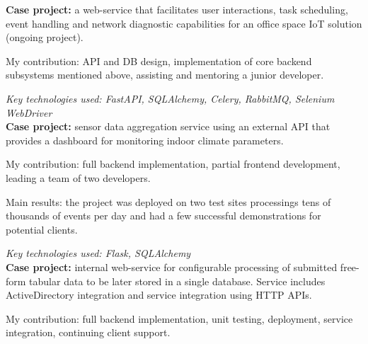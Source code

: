 \documentclass[
	a4paper,
]{fortysecondscv}
\begin{document}
\makefrontsidebar

\begin{cvtable}[3]
\end{cvtable}


\textbf{Case project:} a web-service that facilitates user interactions, task scheduling, event handling and network diagnostic capabilities for an office space IoT solution (ongoing project).

My contribution: API and DB design, implementation of core backend subsystems mentioned above, assisting and mentoring a junior developer.

\textit{Key technologies used: FastAPI, SQLAlchemy, Celery, RabbitMQ, Selenium WebDriver}
\\[0.5em]
\textbf{Case project:} sensor data aggregation service using an external API that provides a dashboard for monitoring indoor climate parameters.

My contribution: full backend implementation, partial frontend development, leading a team of two developers.

Main results: the project was deployed on two test sites processings tens of thousands of events per day and had a few successful demonstrations for potential clients.

\textit{Key technologies used: Flask, SQLAlchemy}
\\[0.5em]
\textbf{Case project:} internal web-service for configurable processing of submitted free-form tabular data to be later stored in a single database. Service includes ActiveDirectory integration and service integration using HTTP APIs.

My contribution: full backend implementation, unit testing, deployment, service integration, continuing client support.
\end{document}

